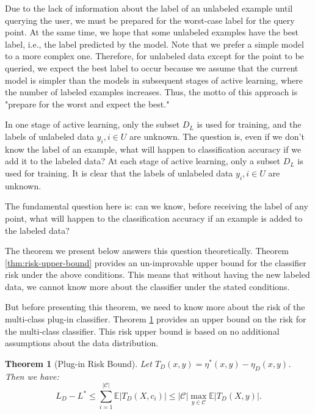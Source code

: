\documentclass[12pt]{article}
\newtheorem{theorem}{Theorem}[section]
\begin{document}
	Due to the lack of information about the label of an unlabeled example until querying the user, we must be prepared for the worst-case label for the query point. At the same time, we hope that some unlabeled examples have the best label, i.e., the label predicted by the model. Note that we prefer a simple model to a more complex one. Therefore, for unlabeled data except for the point to be queried, we expect the best label to occur because we assume that the current model is simpler than the models in subsequent stages of active learning, where the number of labeled examples increases. Thus, the motto of this approach is "prepare for the worst and expect the best."
	
	In one stage of active learning, only the subset $D_L$ is used for training, and the labels of unlabeled data $y_i, i \in U$ are unknown. The question is, even if we don't know the label of an example, what will happen to classification accuracy if we add it to the labeled data? At each stage of active learning, only a subset $D_L$ is used for training. It is clear that the labels of unlabeled data $y_i, i \in U$ are unknown.
	
	The fundamental question here is: can we know, before receiving the label of any point, what will happen to the classification accuracy if an example is added to the labeled data?
	
	The theorem we present below answers this question theoretically. Theorem \ref{thm:risk-upper-bound} provides an un-improvable upper bound for the classifier risk under the above conditions. This means that without having the new labeled data, we cannot know more about the classifier under the stated conditions.
	
	But before presenting this theorem, we need to know more about the risk of the multi-class plug-in classifier. Theorem \ref{thm:plug-in-risk-bound} provides an upper bound on the risk for the multi-class classifier. This risk upper bound is based on no additional assumptions about the data distribution.
	
	\begin{theorem}[Plug-in Risk Bound]
		\label{thm:plug-in-risk-bound}
		Let $T_D(x, y) = \eta^*(x, y) - \eta_D(x, y)$. Then we have:
		\begin{equation}
			L_D - L^* \le \sum_{i=1}^{|\mathcal{C}|} \mathbb{E}|T_D(X, c_i)| \le |\mathcal{C}| \max_{y \in \mathcal{C}} \mathbb{E}|T_D(X, y)|.
		\end{equation}
	\end{theorem}
	
\end{document}
